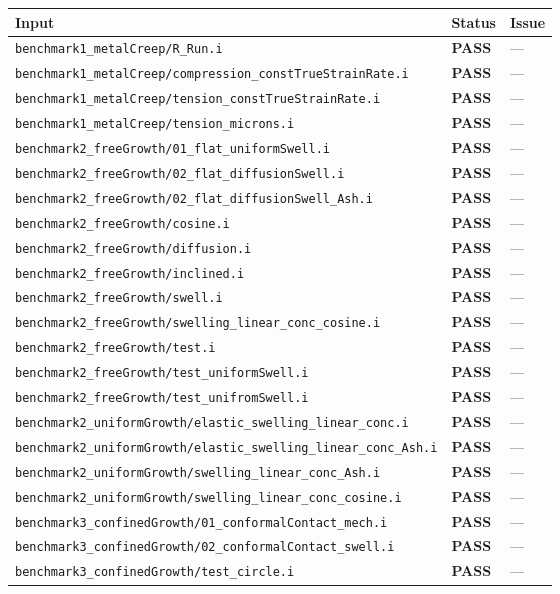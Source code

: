 \documentclass[10pt,letterpaper]{article}
\newcommand{\PASS}{\textcolor{passgreen}{\textbf{PASS}}}
\newcommand{\code}[1]{\texttt{\small #1}}
\begin{document}
\begin{longtable}{p{} l p{}}
\toprule
Input & Status & Issue \\
\midrule
\endhead
\code{benchmark1\_metalCreep/R\_Run.i} & \PASS & --- \\
\code{benchmark1\_metalCreep/compression\_constTrueStrainRate.i} & \PASS & --- \\
\code{benchmark1\_metalCreep/tension\_constTrueStrainRate.i} & \PASS & --- \\
\code{benchmark1\_metalCreep/tension\_microns.i} & \PASS & --- \\
\code{benchmark2\_freeGrowth/01\_flat\_uniformSwell.i} & \PASS & --- \\
\code{benchmark2\_freeGrowth/02\_flat\_diffusionSwell.i} & \PASS & --- \\
\code{benchmark2\_freeGrowth/02\_flat\_diffusionSwell\_Ash.i} & \PASS & --- \\
\code{benchmark2\_freeGrowth/cosine.i} & \PASS & --- \\
\code{benchmark2\_freeGrowth/diffusion.i} & \PASS & --- \\
\code{benchmark2\_freeGrowth/inclined.i} & \PASS & --- \\
\code{benchmark2\_freeGrowth/swell.i} & \PASS & --- \\
\code{benchmark2\_freeGrowth/swelling\_linear\_conc\_cosine.i} & \PASS & --- \\
\code{benchmark2\_freeGrowth/test.i} & \PASS & --- \\
\code{benchmark2\_freeGrowth/test\_uniformSwell.i} & \PASS & --- \\
\code{benchmark2\_freeGrowth/test\_unifromSwell.i} & \PASS & --- \\
\code{benchmark2\_uniformGrowth/elastic\_swelling\_linear\_conc.i} & \PASS & --- \\
\code{benchmark2\_uniformGrowth/elastic\_swelling\_linear\_conc\_Ash.i} & \PASS & --- \\
\code{benchmark2\_uniformGrowth/swelling\_linear\_conc\_Ash.i} & \PASS & --- \\
\code{benchmark2\_uniformGrowth/swelling\_linear\_conc\_cosine.i} & \PASS & --- \\
\code{benchmark3\_confinedGrowth/01\_conformalContact\_mech.i} & \PASS & --- \\
\code{benchmark3\_confinedGrowth/02\_conformalContact\_swell.i} & \PASS & --- \\
\code{benchmark3\_confinedGrowth/test\_circle.i} & \PASS & --- \\

\end{longtable}
\end{document}
